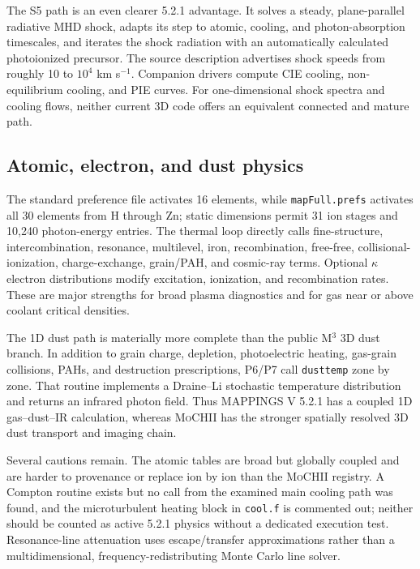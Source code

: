 \documentclass[english,a4paper]{my_memo}
\newcommand{\code}[1]{\texttt{#1}}
\newcommand{\MoCHII}{\textsc{MoCHII}}
\newcommand{\Mthree}{M$^3$}
\newcommand{\Mappings}{MAPPINGS V 5.2.1}
\begin{document}
The S5 path is an even clearer 5.2.1 advantage.  It solves a steady,
plane-parallel radiative MHD shock, adapts its step to atomic, cooling, and
photon-absorption timescales, and iterates the shock radiation with an
automatically calculated photoionized precursor.  The source description
advertises shock speeds from roughly 10 to $10^4$ km s$^{-1}$.  Companion
drivers compute CIE cooling, non-equilibrium cooling, and PIE curves.  For
one-dimensional shock spectra and cooling flows, neither current 3D code
offers an equivalent connected and mature path.

\subsection{Atomic, electron, and dust physics}

The standard preference file activates 16 elements, while
\code{mapFull.prefs} activates all 30 elements from H through Zn; static
dimensions permit 31 ion stages and 10,240 photon-energy entries.  The
thermal loop directly calls fine-structure, intercombination, resonance,
multilevel, iron, recombination, free-free, collisional-ionization,
charge-exchange, grain/PAH, and cosmic-ray terms.  Optional $\kappa$
electron distributions modify excitation, ionization, and recombination
rates.  These are major strengths for broad plasma diagnostics and for
gas near or above coolant critical densities.

The 1D dust path is materially more complete than the public \Mthree{} 3D
dust branch.  In addition to grain charge, depletion, photoelectric
heating, gas-grain collisions, PAHs, and destruction prescriptions,
P6/P7 call \code{dusttemp} zone by zone.  That routine implements a
Draine--Li stochastic temperature distribution and returns an infrared
photon field.  Thus \Mappings{} has a coupled 1D gas--dust--IR calculation,
whereas \MoCHII{} has the stronger spatially resolved 3D dust transport
and imaging chain.

Several cautions remain.  The atomic tables are broad but globally coupled
and are harder to provenance or replace ion by ion than the \MoCHII{}
registry.  A Compton routine exists but no call from the examined main
cooling path was found, and the microturbulent heating block in
\code{cool.f} is commented out; neither should be counted as active 5.2.1
physics without a dedicated execution test.  Resonance-line attenuation
uses escape/transfer approximations rather than a multidimensional,
frequency-redistributing Monte Carlo line solver.
\end{document}

